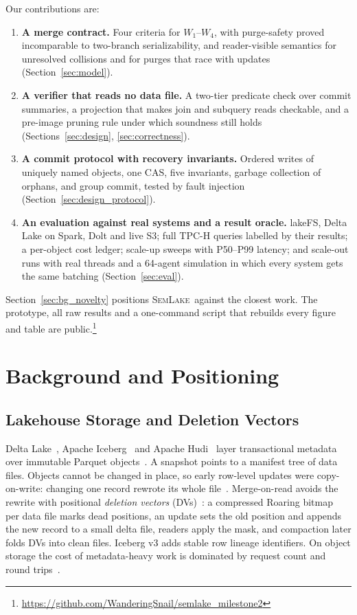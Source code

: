 \documentclass[sigconf, nonacm]{acmart}
\newcommand{\systemname}{\textsc{SemLake}}
\begin{document}
Our contributions are:
\begin{enumerate}[leftmargin=8pt, itemsep=0pt, topsep=1pt]
    \item \textbf{A merge contract.} Four criteria for $W_1$--$W_4$, with purge-safety proved incomparable to two-branch serializability, and reader-visible semantics for unresolved collisions and for purges that race with updates (Section~\ref{sec:model}).
    \item \textbf{A verifier that reads no data file.} A two-tier predicate check over commit summaries, a projection that makes join and subquery reads checkable, and a pre-image pruning rule under which soundness still holds (Sections~\ref{sec:design}, \ref{sec:correctness}).
    \item \textbf{A commit protocol with recovery invariants.} Ordered writes of uniquely named objects, one CAS, five invariants, garbage collection of orphans, and group commit, tested by fault injection (Section~\ref{sec:design_protocol}).
    \item \textbf{An evaluation against real systems and a result oracle.} lakeFS, Delta Lake on Spark, Dolt and live S3; full TPC-H queries labelled by their results; a per-object cost ledger; scale-up sweeps with P50--P99 latency; and scale-out runs with real threads and a 64-agent simulation in which every system gets the same batching (Section~\ref{sec:eval}).
\end{enumerate}
Section~\ref{sec:bg_novelty} positions \systemname\ against the closest work. The prototype, all raw results and a one-command script that rebuilds every figure and table are public.\footnote{\url{https://github.com/WanderingSnail/semlake_milestone2}}

\section{Background and Positioning}
\label{sec:background}

\subsection{Lakehouse Storage and Deletion Vectors}
\label{sec:bg_lakehouse}

Delta Lake~\cite{armbrust2020delta}, Apache Iceberg~\cite{iceberg2025v3} and Apache Hudi~\cite{jain2023analyzing, sumit2026hudi} layer transactional metadata over immutable Parquet objects~\cite{zaharia2021lakehouse, harby2025survey}. A snapshot points to a manifest tree of data files. Objects cannot be changed in place, so early row-level updates were copy-on-write: changing one record rewrote its whole file~\cite{camacho2024lstbench}. Merge-on-read avoids the rewrite with positional \emph{deletion vectors} (DVs)~\cite{okolnychyi2024petabyte, iceberg2025v3, delta2024rowlevel}: a compressed Roaring bitmap~\cite{lemire2018roaring} per data file marks dead positions, an update sets the old position and appends the new record to a small delta file, readers apply the mask, and compaction later folds DVs into clean files. Iceberg v3 adds stable row lineage identifiers. On object storage the cost of metadata-heavy work is dominated by request count and round trips~\cite{durner2023exploiting}.
\end{document}
